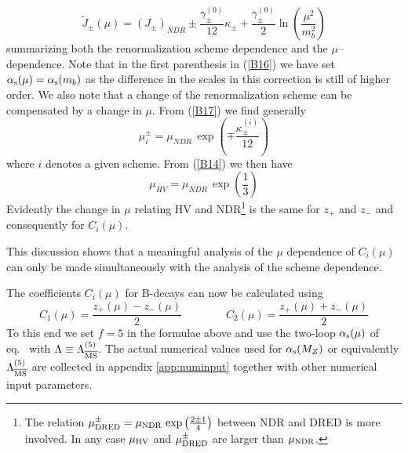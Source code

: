 \begin{equation}\label{B17}
\tilde J_\pm(\mu)=(J_\pm)_{NDR}\pm 
\frac{\gamma^{(0)}_\pm}{12}\kappa_\pm
+\frac{\gamma^{(0)}_\pm}{2}\ln(\frac{\mu^2}{m^2_b})
\end{equation}
summarizing both the renormalization scheme dependence and the
$\mu$--dependence. Note that in the first parenthesis in (\ref{B16}) we
have set $\alpha_{\rm s}(\mu)=\alpha_{\rm s}(m_b)$ as the difference in the scales
in this correction is still of higher order.  We also note that a
change of the renormalization scheme can be compensated by a change in
$\mu$. From (\ref{B17}) we find generally
\begin{equation}\label{B18}
\mu_i^\pm=\mu_{NDR} \, \exp\left(\mp\frac{\kappa_\pm^{(i)}}{12}\right)
\end{equation}
where $i$ denotes a given scheme. From (\ref{B14}) we then have
\begin{equation}\label{B19}
\mu_{HV}=\mu_{NDR} \, \exp\left(\frac{1}{3}\right)
\end{equation}
Evidently the change in $\mu$ relating HV and NDR\footnote{ The
relation $\mu_{\rm DRED}^{\pm} = \mu_{\rm NDR} \, \exp\left(\frac{2\pm
1}{4}\right)$ between NDR and DRED is more involved. In any case
$\mu_{\rm HV}$ and $\mu_{\rm DRED}^\pm$ are larger than $\mu_{\rm
NDR}$.} is the same for $z_+$ and $z_-$ and consequently for
$C_i(\mu)$.

This discussion shows that a meaningful analysis of the $\mu$
dependence of $C_i(\mu)$ can only be made simultaneously with the
analysis of the scheme dependence.

The coefficients $C_i(\mu)$ for B-decays can now be calculated using
\begin{equation}\label{B20}
C_1(\mu)=\frac{z_+(\mu)-z_-(\mu)}{2}
\qquad\qquad
C_2(\mu)=\frac{z_+(\mu)+z_-(\mu)}{2}
\end{equation}
To this end we set $f=5$ in the formulae above and use the two-loop
$\alpha_{\rm s}(\mu)$ of eq.\  with $\Lambda \equiv \Lambda_{\overline{\rm MS}}^{(5)}$. The
actual numerical values used for $\alpha_{\rm s}(M_Z)$ or equivalently
$\Lambda_{\overline{\rm MS}}^{(5)}$ are collected in appendix \ref{app:numinput} together with
other numerical input parameters.

